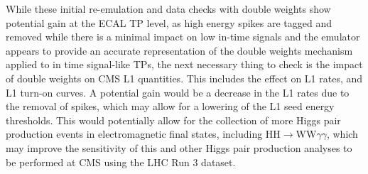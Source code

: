 While these initial re-emulation and data checks with double weights show potential gain at the ECAL TP level, as high energy spikes are tagged and removed while there is a minimal impact on low in-time signals and the emulator appears to provide an accurate representation of the double weights mechanism applied to in time signal-like TPs, the next necessary thing to check is the impact of double weights on CMS L1 quantities. This includes the effect on L1 rates, and L1 turn-on curves. A potential gain would be a decrease in the L1 rates due to the removal of spikes, which may allow for a lowering of the L1 seed energy thresholds. This would potentially allow for the collection of more Higgs pair production events in electromagnetic final states, including HH$\rightarrow$WW$\gamma\gamma$, which may improve the sensitivity of this and other Higgs pair production analyses to be performed at CMS using the LHC Run 3 dataset. 